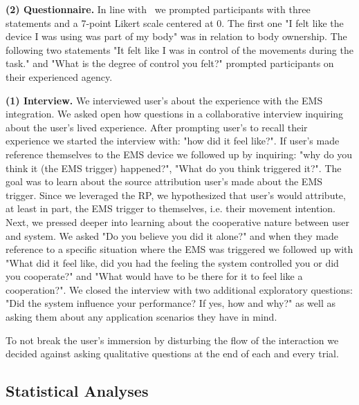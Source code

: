 \indent\textbf{(2) Questionnaire.}
In line with~\cite{Hornbaek} we prompted participants with three statements and a 7-point Likert scale centered at 0. The first one "I felt like the device I was using was part of my body" was in relation to body ownership. The following two statements "It felt like I was in control of the movements during the task." and "What is the degree of control you felt?" prompted participants on their experienced agency.

\indent\textbf{(1) Interview.}
We interviewed user's about the experience with the EMS integration. We asked open how questions in a collaborative interview inquiring about the user's lived experience. After prompting user's to recall their experience we started the interview with: "how did it feel like?". If user's made reference themselves to the EMS device we followed up by inquiring: "why do you think it (the EMS trigger) happened?", "What do you think triggered it?". The goal was to learn about the source attribution user's made about the EMS trigger. Since we leveraged the RP, we hypothesized that user's would attribute, at least in part, the EMS trigger to themselves, i.e. their movement intention. Next, we pressed deeper into learning about the cooperative nature between user and system. We asked "Do you believe you did it alone?" and when they made reference to a specific situation where the EMS was triggered we followed up with "What did it feel like, did you had the feeling the system controlled you or did you cooperate?" and "What would have to be there for it to feel like a cooperation?". We closed the interview with two additional exploratory questions: "Did the system influence your performance? If yes, how and why?" as well as asking them about any application scenarios they have in mind. 

To not break the user's immersion by disturbing the flow of the interaction we decided against asking qualitative questions at the end of each and every trial.

\subsection{Statistical Analyses}




